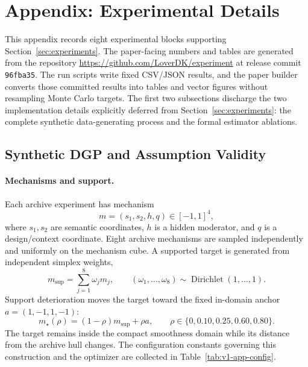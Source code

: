\documentclass[11pt]{article}
\numberwithin{equation}{section}
\newcommand{\1}{\mathbf 1}
\begin{document}
\section{Appendix: Experimental Details}
\label{app:experiments}

This appendix records eight experimental blocks supporting Section~\ref{sec:experiments}.  The paper-facing numbers and tables are generated from the repository \url{https://github.com/LoverDK/experiment} at release commit \texttt{96fba35}.  The run scripts write fixed CSV/JSON results, and the paper builder converts those committed results into tables and vector figures without resampling Monte Carlo targets.  The first two subsections discharge the two implementation details explicitly deferred from Section~\ref{sec:experiments}: the complete synthetic data-generating process and the formal estimator ablations.

\subsection{Synthetic DGP and Assumption Validity}
\label{app:synthetic-dgp}
\suppressfloats[t]

\paragraph{Mechanisms and support.}
Each archive experiment has mechanism
\[
  m=(s_1,s_2,h,q)\in[-1,1]^4,
\]
where $s_1,s_2$ are semantic coordinates, $h$ is a hidden moderator, and $q$ is a design/context coordinate.  Eight archive mechanisms are sampled independently and uniformly on the mechanism cube.  A supported target is generated from independent simplex weights,
\[
  m_{\mathrm{sup}}=\sum_{j=1}^{8}\omega_jm_j,
  \qquad
  (\omega_1,\ldots,\omega_8)\sim\operatorname{Dirichlet}(1,\ldots,1).
\]
Support deterioration moves the target toward the fixed in-domain anchor $a=(1,-1,1,-1)$:
\[
  m_\star(\rho)=(1-\rho)m_{\mathrm{sup}}+\rho a,
  \qquad \rho\in\{0,0.10,0.25,0.60,0.80\}.
\]
The target remains inside the compact smoothness domain while its distance from the archive hull changes. The configuration constants governing this construction and the optimizer are collected in Table~\ref{tab:v1-app-config}.
\end{document}
